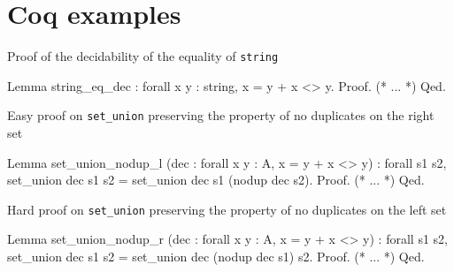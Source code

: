 \chapter{Coq examples}

\begin{listing}
\caption{Proof of the decidability of the equality of \texttt{string}}
\label{lst:string_eq_dec}

\begin{coqcode}
Lemma string_eq_dec :
    forall x y : string, {x = y} + {x <> y}.
Proof.
    (* ... *)
Qed.
\end{coqcode}
\end{listing}

\begin{listing}
\caption{Easy proof on \texttt{set_union} preserving the property of no duplicates on the right set}
\label{lst:set_union_nodup_r}
\begin{coqcode}
Lemma set_union_nodup_l (dec : forall x y : A, {x = y} + {x <> y}) :
    forall s1 s2,
        set_union dec s1 s2 = set_union dec s1 (nodup dec s2).
Proof.
    (* ... *)
Qed.
\end{coqcode}
\end{listing}

\begin{listing}
\caption{Hard proof on \texttt{set_union} preserving the property of no duplicates on the left set}
\label{lst:set_union_nodup_l}
\begin{coqcode}
Lemma set_union_nodup_r (dec : forall x y : A, {x = y} + {x <> y}) :
    forall s1 s2,
        set_union dec s1 s2 = set_union dec (nodup dec s1) s2.
Proof.
    (* ... *)
Qed.
\end{coqcode}
\end{listing}

